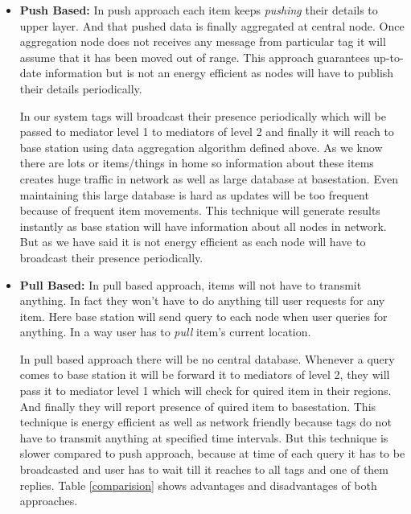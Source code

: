 \documentclass [a4paper,12pt]{book}
\begin{document}
\begin{itemize}
\item \textbf{Push Based:} In push approach each item keeps \emph{pushing} their details to upper layer. And that pushed data is finally aggregated at central node. Once aggregation node does not receives any message from particular tag it will assume that it has been moved out of range. This approach guarantees up-to-date information but is not an energy efficient as nodes will have to publish their details periodically. 

\hspace{1em} In our system tags will broadcast their presence periodically which will be passed to mediator level 1 to mediators of level 2 and finally it will reach to base station using data aggregation algorithm defined above. As we know there are lots or items/things in home so information about these items creates huge traffic in network as well as large database at basestation. Even maintaining this large database is hard as updates will be too frequent because of frequent item movements. This technique will generate results instantly as base station will have information about all nodes in network. But as we have said it is not energy efficient as each node will have to broadcast their presence periodically.

\item \textbf{Pull Based:} In pull based approach, items will not have to transmit anything. In fact they won't have to do anything till user requests for any item. Here base station will send query to each node when user queries for anything. In a way user has to \emph{pull} item's current location. 

\hspace{1em} In pull based approach there will be no central database. Whenever a query comes to base station it will be forward it to mediators of level 2, they will pass it to mediator level 1 which will check for quired item in their regions. And finally they will report presence of quired item to basestation. This technique is energy efficient as well as network friendly because tags do not have to transmit anything at specified time intervals. But this technique is slower compared to push approach, because at time of each query it has to be broadcasted and user has to wait till it reaches to all tags and one of them replies. Table \ref{comparision} shows advantages and disadvantages of both approaches.
\end{itemize}
\end{document}
